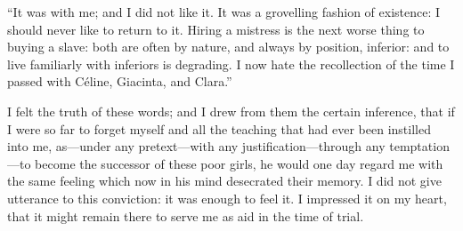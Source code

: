 \enquote{It was with me; and I did not like it. It was a grovelling
	fashion of existence: I should never like to return to it. Hiring a
	mistress is the next worse thing to buying a slave: both are often by
	nature, and always by position, inferior: and to live familiarly with
	inferiors is degrading. I now hate the recollection of the time I
	passed with Céline, Giacinta, and Clara.}

I felt the truth of these words; and I drew from them the certain
inference, that if I were so far to forget myself and all the teaching
that had ever been instilled into me, as---under any pretext---with any
justification---through any temptation---to become the successor of
these poor girls, he would one day regard me with the same feeling which
now in his mind desecrated their memory. I did not give utterance to
this conviction: it was enough to feel it. I impressed it on my heart,
that it might remain there to serve me as aid in the time of trial.

